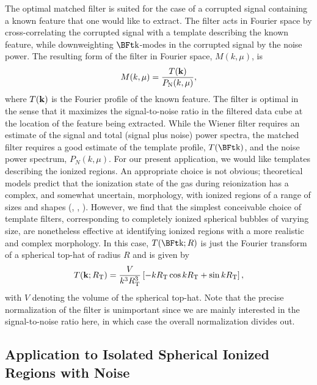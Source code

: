 The optimal matched filter is suited for the case of a corrupted 
signal containing a known feature that one would like to extract. The
filter acts in Fourier space by cross-correlating the corrupted signal
with a template describing the known feature, while 
downweighting $\k$-modes in the
corrupted signal by the noise power. The resulting form of the filter in
Fourier space,
$M(k, \mu)$, is 
\begin{equation} M(k,\mu) = \frac{T({\bf k})}{P_{\text{N}}(k,\mu)}, \label{eq:MatchedFilter} \end{equation}
where $T({\bf k})$ is the Fourier profile of the known feature. The
filter is optimal in the sense that it maximizes the signal-to-noise
ratio in the filtered data cube at the location of the feature being
extracted. While the Wiener filter requires an estimate of the signal and total (signal plus noise) power spectra,
the matched filter requires a good estimate of the template profile, $T(\k)$, and the noise power spectrum, $P_{N}(k,\mu)$. For our present application,
we would like templates describing the ionized regions.
An appropriate choice is not obvious; theoretical models predict that the
ionization state of the gas during reionization has a complex, and
somewhat uncertain, morphology, with ionized regions of a range of
sizes and shapes (\citealt{Iliev:2005sz}, \citealt{Zahn:2006sg},
\citealt{McQuinn:2006et}). However, we find that the simplest conceivable
choice of template filters, corresponding to completely ionized 
spherical bubbles of varying size, are nonetheless effective at
identifying ionized regions with a more realistic and complex
morphology. In this case, $T(\k;R)$ is just the Fourier transform
of a spherical top-hat of radius $R$ and is given by
\begin{equation} T({\bf k};R_{\text{T}}) = \frac{V}{k^3R_{\text{T}}^3}\left[ -kR_{\text{T}}\cos kR_{\text{T}} + \sin kR_{\text{T}} \right], \label{eq:Template} \end{equation}
with $V$ denoting the volume of the spherical top-hat. Note that the precise normalization of the filter is unimportant since
we are mainly interested in the signal-to-noise ratio here, in which case the overall normalization divides out.


\subsection{Application to Isolated Spherical Ionized Regions with Noise} \label{sec:toy}


